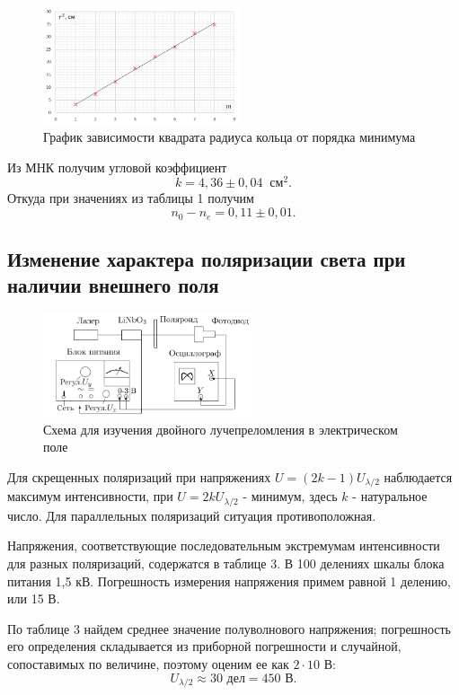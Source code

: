 \documentclass[a4paper]{article}
\begin{document}
\begin{figure}[ht!]
    \centering
    \includegraphics[width = 0.52\textwidth]{image/graph.png}
    \caption{График зависимости квадрата радиуса кольца от порядка минимума}
\end{figure}

\noindent Из МНК получим угловой коэффициент $$k = 4,36 \pm 0,04 \;\; \text{см}^2.$$ Откуда при значениях из таблицы 1 получим $$n_0 - n_e = 0,11 \pm 0,01.$$

\subsection{Изменение характера поляризации света при наличии внешнего поля}

\begin{figure}[ht!]
    \centering
    \includegraphics[width = 0.55\textwidth]{image/pic2.png}
    \caption{Схема для изучения двойного лучепреломления в электрическом поле}
\end{figure}

\noindent Для скрещенных поляризаций при напряжениях $U = (2k - 1)U_{\lambda/2}$ наблюдается максимум интенсивности, при $U = 2kU_{\lambda/2}$ - минимум, здесь $k$ - натуральное число. Для параллельных поляризаций ситуация противоположная. 
	
\noindent Напряжения, соответствующие последовательным экстремумам интенсивности для разных поляризаций, содержатся в таблице 3. В 100 делениях шкалы блока питания 1,5 кВ. Погрешность измерения напряжения примем равной 1 делению, или 15 В. \medskip

\noindent По таблице 3 найдем среднее значение полуволнового напряжения; погрешность его определения складывается из приборной погрешности и случайной, сопоставимых по величине, поэтому оценим ее как $2\cdot 10$ В: $$U_{\lambda / 2} \approx 30 \text{ дел} = 450 \text{ В}.$$
\end{document}
